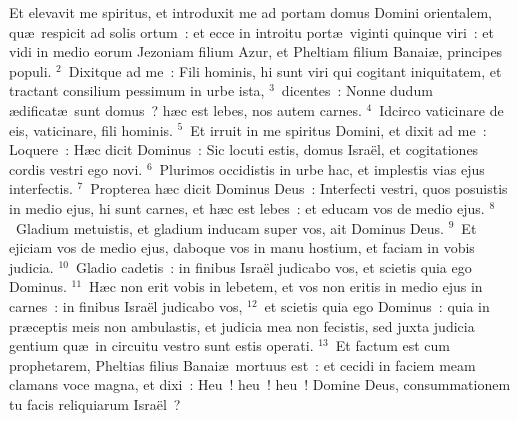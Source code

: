 \bchapter
\lettrine[lines=3,image=true,loversize=0.05,lraise=-0.03]{E}{}t elevavit me spiritus, et introduxit me ad portam domus Domini orientalem, qu\ae\ respicit ad solis ortum~: et ecce in introitu port\ae\ viginti quinque viri~: et vidi in medio eorum Jezoniam filium Azur, et Pheltiam filium Banai\ae , principes populi.
${}^{2}$~Dixitque ad me~: Fili hominis, hi sunt viri qui cogitant iniquitatem, et tractant consilium pessimum in urbe ista,
${}^{3}$~dicentes~: Nonne dudum \ae dificat\ae\ sunt domus~? h\ae c est lebes, nos autem carnes.
${}^{4}$~Idcirco vaticinare de eis, vaticinare, fili hominis.
${}^{5}$~Et irruit in me spiritus Domini, et dixit ad me~: Loquere~: H\ae c dicit Dominus~: Sic locuti estis, domus Isra\"el, et cogitationes cordis vestri ego novi.
${}^{6}$~Plurimos occidistis in urbe hac, et implestis vias ejus interfectis.
${}^{7}$~Propterea h\ae c dicit Dominus Deus~: Interfecti vestri, quos posuistis in medio ejus, hi sunt carnes, et h\ae c est lebes~: et educam vos de medio ejus.
${}^{8}$~Gladium metuistis, et gladium inducam super vos, ait Dominus Deus.
${}^{9}$~Et ejiciam vos de medio ejus, daboque vos in manu hostium, et faciam in vobis judicia.
${}^{10}$~Gladio cadetis~: in finibus Isra\"el judicabo vos, et scietis quia ego Dominus.
${}^{11}$~H\ae c non erit vobis in lebetem, et vos non eritis in medio ejus in carnes~: in finibus Isra\"el judicabo vos,
${}^{12}$~et scietis quia ego Dominus~: quia in pr\ae ceptis meis non ambulastis, et judicia mea non fecistis, sed juxta judicia gentium qu\ae\ in circuitu vestro sunt estis operati.
${}^{13}$~Et factum est cum prophetarem, Pheltias filius Banai\ae\ mortuus est~: et cecidi in faciem meam clamans voce magna, et dixi~: Heu~! heu~! heu~! Domine Deus, consummationem tu facis reliquiarum Isra\"el~?


